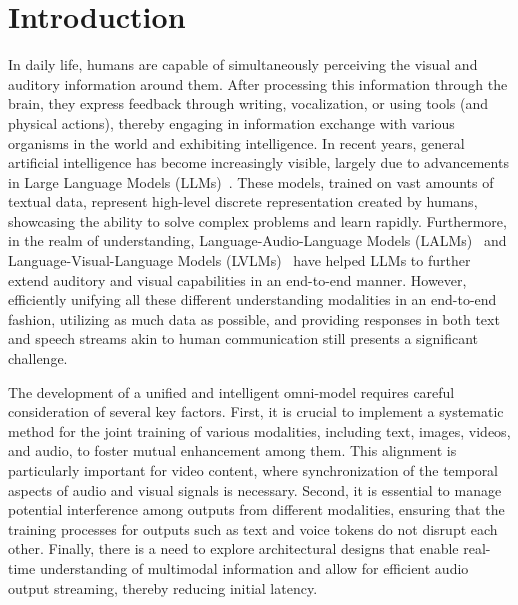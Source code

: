 \section{Introduction}
\label{sec:intro}


In daily life, humans are capable of simultaneously perceiving the visual and auditory information around them. After processing this information through the brain, they express feedback through writing, vocalization, or using tools (and physical actions), thereby engaging in information exchange with various organisms in the world and exhibiting intelligence. In recent years, general artificial intelligence has become increasingly visible, largely due to advancements in Large Language Models (LLMs)~\citep{gpt3,gpt4,gpt4o,gemini,claude,claude2,claude3,qwen,qwen2,llama,llama2,llama3}. These models, trained on vast amounts of textual data, represent high-level discrete representation created by humans, showcasing the ability to solve complex problems and learn rapidly. Furthermore, in the realm of understanding, Language-Audio-Language Models (LALMs)~\citep{gpt4o,anonymous2023salmonn,qwenaudio, qwen2-audio} and Language-Visual-Language Models (LVLMs)~\citep{blip2,llava,instructblip,minigpt-4,kosmos,qwenvl,llava1.5,cogvlm,gpt4v,gemini} have helped LLMs to further extend auditory and visual capabilities in an end-to-end manner. %
However, efficiently unifying all these different understanding modalities in an end-to-end fashion, utilizing as much data as possible, and providing responses in both text and speech streams akin to human communication still presents a significant challenge.


The development of a unified and intelligent omni-model requires careful consideration of several key factors. First, it is crucial to implement a systematic method for the joint training of various modalities, including text, images, videos, and audio, to foster mutual enhancement among them. This alignment is particularly important for video content, where synchronization of the temporal aspects of audio and visual signals is necessary. Second, it is essential to manage potential interference among outputs from different modalities, ensuring that the training processes for outputs such as text and voice tokens do not disrupt each other. Finally, there is a need to explore architectural designs that enable real-time understanding of multimodal information and allow for efficient audio output streaming, thereby reducing initial latency.


